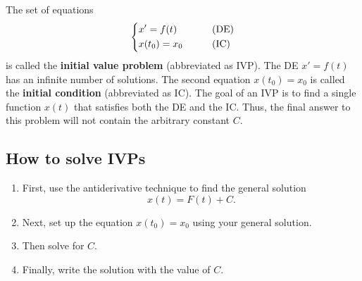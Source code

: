 \documentclass[letterpaper]{article}
\begin{document}
The set of equations 
\[
\begin{dcases}
    x' = f(t) &\qquad \text{(DE)}\\
    x(t_0) = x_0 &\qquad \text{(IC)}
\end{dcases}
\]
is called the \textbf{initial value problem} (abbreviated as IVP). 
The DE $x'=f(t)$ has an infinite number of solutions. The second equation 
$
x(t_0)=x_0
$
is called the \textbf{initial condition} (abbreviated as IC). The goal of an IVP is to find a single function $x(t)$ that satisfies both the DE and the IC.
Thus, the final answer to this problem will not contain the arbitrary constant $C$.

\subsection{How to solve IVPs}
\begin{enumerate}
    \item First, use the antiderivative technique to find the general solution 
\[
x(t) = F(t) +C.
\]
    \item Next, set up the equation $x(t_0)=x_0$ using your general solution. 
    \item Then solve for $C$. 
    \item Finally, write the solution with the value of $C$.
\end{enumerate}
\end{document}
